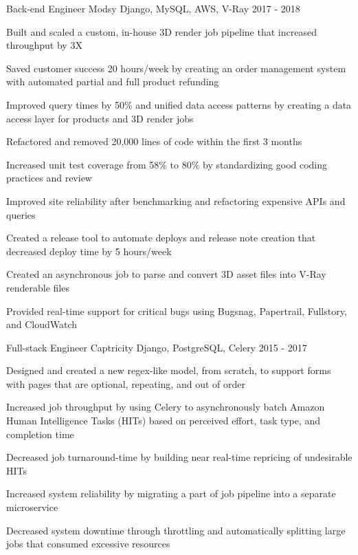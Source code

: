\begin{cventries}
  \cventry
    {Back-end Engineer}
    {Modsy}
    {Django, MySQL, AWS, V-Ray}
    {2017 - 2018}
    {
      \begin{cvitems}
        \item {Built and scaled a custom, in-house 3D render job pipeline that increased throughput by 3X}
        \item {Saved customer success 20 hours/week by creating an order management system with automated partial and full product refunding}
        \item {Improved query times by 50\% and unified data access patterns by creating a data access layer for products and 3D render jobs}
        \item {Refactored and removed 20,000 lines of code within the first 3 months}
        \item {Increased unit test coverage from 58\% to 80\% by standardizing good coding practices and review}
        \item {Improved site reliability after benchmarking and refactoring expensive APIs and queries}
        \item {Created a release tool to automate deploys and release note creation that decreased deploy time by 5 hours/week}
        \item {Created an asynchronous job to parse and convert 3D asset files into V-Ray renderable files}
        \item {Provided real-time support for critical bugs using Bugsnag, Papertrail, Fullstory, and CloudWatch}
      \end{cvitems}
    }
  \cventry
    {Full-stack Engineer}
    {Captricity}
    {Django, PostgreSQL, Celery}
    {2015 - 2017}
    {
      \begin{cvitems}
        \item {Designed and created a new regex-like model, from scratch, to support forms with pages that are optional, repeating, and out of order}
        \item {Increased job throughput by using Celery to asynchronously batch Amazon Human Intelligence Tasks (HITs) based on perceived effort, task type, and completion time}
        \item {Decreased job turnaround-time by building near real-time repricing of undesirable HITs}
        \item {Increased system reliability by migrating a part of job pipeline into a separate microservice}
        \item {Decreased system downtime through throttling and automatically splitting large jobs that consumed excessive resources}

\end{cvitems}}
\end{cventries}
